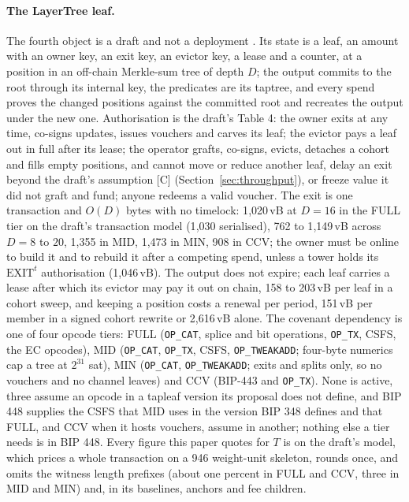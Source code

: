 \documentclass[11pt]{article}
\theoremstyle{plain}
\theoremstyle{definition}
\theoremstyle{remark}
\begin{document}
\paragraph{The LayerTree leaf.}\label{sec:layertree} The fourth object is a draft and not a deployment \citep{osuntokun2026layertree}. Its state is a leaf, an amount with an owner key, an exit key, an evictor key, a lease and a counter, at a position in an off-chain Merkle-sum tree of depth $D$; the output commits to the root through its internal key, the predicates are its taptree, and every spend proves the changed positions against the committed root and recreates the output under the new one. Authorisation is the draft's Table 4: the owner exits at any time, co-signs updates, issues vouchers and carves its leaf; the evictor pays a leaf out in full after its lease; the operator grafts, co-signs, evicts, detaches a cohort and fills empty positions, and cannot move or reduce another leaf, delay an exit beyond the draft's assumption [C] (Section~\ref{sec:throughput}), or freeze value it did not graft and fund; anyone redeems a valid voucher. The exit is one transaction and $O(D)$ bytes with no timelock: 1{,}020\,vB at $D=16$ in the FULL tier on the draft's transaction model (1{,}030 serialised), 762 to 1{,}149\,vB across $D=8$ to $20$, 1{,}355 in MID, 1{,}473 in MIN, 908 in CCV; the owner must be online to build it and to rebuild it after a competing spend, unless a tower holds its $\mathrm{EXIT}^{t}$ authorisation (1{,}046\,vB). The output does not expire; each leaf carries a lease after which its evictor may pay it out on chain, 158 to 203\,vB per leaf in a cohort sweep, and keeping a position costs a renewal per period, 151\,vB per member in a signed cohort rewrite or 2{,}616\,vB alone. The covenant dependency is one of four opcode tiers: FULL (\texttt{OP\_CAT}, splice and bit operations, \texttt{OP\_TX}, CSFS, the EC opcodes), MID (\texttt{OP\_CAT}, \texttt{OP\_TX}, CSFS, \texttt{OP\_TWEAKADD}; four-byte numerics cap a tree at $2^{31}$ sat), MIN (\texttt{OP\_CAT}, \texttt{OP\_TWEAKADD}; exits and splits only, so no vouchers and no channel leaves) and CCV (BIP-443 and \texttt{OP\_TX}). None is active, three assume an opcode in a tapleaf version its proposal does not define, and BIP 448 supplies the CSFS that MID uses in the version BIP 348 defines and that FULL, and CCV when it hosts vouchers, assume in another; nothing else a tier needs is in BIP 448. Every figure this paper quotes for $T$ is on the draft's model, which prices a whole transaction on a 946 weight-unit skeleton, rounds once, and omits the witness length prefixes (about one percent in FULL and CCV, three in MID and MIN) and, in its baselines, anchors and fee children.
\end{document}
